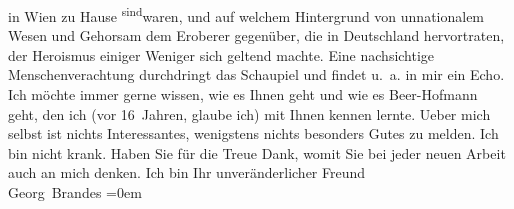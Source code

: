 \begin{ledgroupsized}[t]{13cm}
               in Wien zu Hause \substVorne{}\textsuperscript{sind}\substDazwischen{}waren\substHinten{}, und auf welchem Hintergrund von unnationalem Wesen und Gehorsam dem
               Eroberer gegenüber, die in Deutschland
               hervortraten, der Heroismus einiger Weniger sich geltend machte. Eine nachsichtige
               Menschenverachtung durchdringt das Schaupiel und findet u. a. in mir ein Echo.\pend
           \pstart
           Ich möchte immer gerne wissen, wie es {\pb}Ihnen geht und wie es Beer-Hofmann geht, den ich (vor 16 Jahren,
               glaube ich) mit Ihnen kennen lernte.\pend
           \pstart
           Ueber mich selbst ist nichts Interessantes, wenigstens nichts besonders Gutes zu
               melden. Ich bin nicht krank.\pend
           \pstart
           Haben Sie für die Treue Dank, womit Sie bei jeder neuen Arbeit auch an mich
               denken.\pend
           \pstart
           Ich bin Ihr unveränderlicher Freund{\\[\baselineskip]}\spacefill\mbox{Georg Brandes}\pend
           \leftskip=0em{}
         
         \endnumbering{}\end{ledgroupsized}  \newcommand{\dateiname}{L01991}\newcommand{\titel}{Georg Brandes an Arthur Schnitzler, 18. 12. 1910}\newcommand{\editorInnen}{Martin Anton Müller und Gerd-Hermann Susen}
      